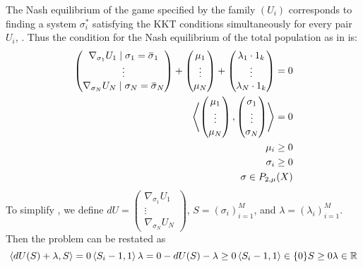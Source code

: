 The Nash equilibrium of the game specified by the family $(U_i)$ corresponds to finding a system $\sigma_i^*$ satisfying the KKT conditions simultaneously for every pair $U_i$, \citep{deimling2010nonlinear}. Thus the condition for the Nash equilibrium of the total population as in  is:
\begin{equation}
  \begin{split}
  \begin{pmatrix}
    \nabla_{\sigma_1} U_1 \mid{\sigma_1 = \overbar{\sigma}_1} \\
    \vdots \\
    \nabla_{\sigma_N} U_N \mid{\sigma_N = \overbar{\sigma}_N}
\end{pmatrix} + \begin{pmatrix}
    \mu_1 \\
    \vdots \\
    \mu_N
\end{pmatrix} + \begin{pmatrix}
    \lambda_1 \cdot 1_k \\
    \vdots \\
    \lambda_N \cdot 1_k
\end{pmatrix} = 0 \\
\ip{
\begin{pmatrix}
  \mu_1 \\
  \vdots \\
  \mu_N
\end{pmatrix}}{ \begin{pmatrix}
  \sigma_1 \\
  \vdots \\
  \sigma_N
\end{pmatrix}} = 0 \\
\mu_i \geq 0 \\
  \sigma_i \geq 0 \\
    \sigma \in P_{2,\mu}(X)
    \label{eq:KKT_total}
  \end{split}
\end{equation}
To simplify , we define $dU = \begin{pmatrix} \nabla_{\sigma_1} U_1 \\
    \vdots \\
    \nabla_{\sigma_N} U_N \end{pmatrix}$, $S=(\sigma_i)_{i=1}^M$, and $\lambda = (\lambda_i)_{i=1}^M$. Then the problem can be restated as
\begin{equation}
  \label{eq:complementarity_form}
  \left \langle dU(S)+\lambda,S \right \rangle = 0 \\
  \left \langle S_i-1,1 \right \rangle\lambda = 0
  -dU(S)-\lambda \geq 0 \\
  \left \langle S_i-1,1 \right \rangle \in \{0 \}
  S\geq 0
  \lambda \in \mathbb{R}
\end{equation}
